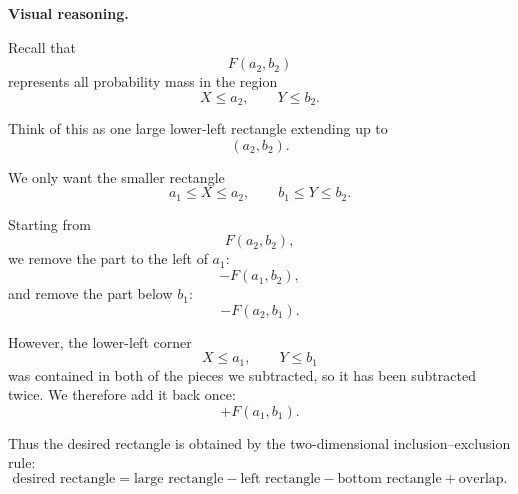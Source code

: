 \documentclass[11pt]{article}
\begin{document}
\begin{solutionbox}
\medskip

\textbf{Visual reasoning.}

Recall that
$$
F(a_2,b_2)
$$
represents all probability mass in the region
$$
X\le a_2,
\qquad
Y\le b_2.
$$

Think of this as one large lower-left rectangle extending up to
$$
(a_2,b_2).
$$

We only want the smaller rectangle
$$
a_1\le X\le a_2,
\qquad
b_1\le Y\le b_2.
$$

Starting from
$$
 {F(a_2,b_2)},
$$
we remove the part to the left of $a_1$:
$$
- {F(a_1,b_2)},
$$
and remove the part below $b_1$:
$$
- {F(a_2,b_1)}.
$$

However, the lower-left corner
$$
X\le a_1,
\qquad
Y\le b_1
$$
was contained in both of the pieces we subtracted, so it has been
subtracted twice. We therefore add it back once:
$$
+ {F(a_1,b_1)}.
$$

Thus the desired rectangle is obtained by the two-dimensional
inclusion--exclusion rule:
$$
 {
\text{desired rectangle}
=
\text{large rectangle}
-\text{left rectangle}
-\text{bottom rectangle}
+\text{overlap}.
}
$$
  





\begin{center}
\end{center}
\end{solutionbox}
\end{document}
